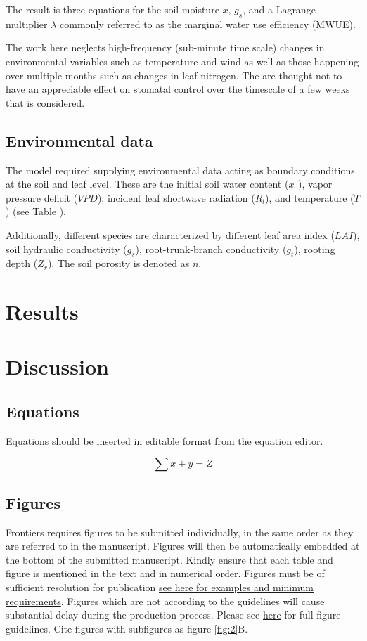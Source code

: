 \documentclass[utf8]{frontiersSCNS} %
\begin{document}
The result is three equations for the soil moisture $x$, $g_s$, and a Lagrange multiplier $\lambda$ commonly referred to as the marginal water use efficiency (MWUE). 

The work here neglects high-frequency (sub-minute time scale) changes in environmental variables such as temperature and wind as well as those happening over multiple months such as changes in leaf nitrogen. The are thought not to have an appreciable effect on stomatal control over the timescale of a few weeks that is considered.

\subsection{Environmental data}

The model required supplying environmental data acting as boundary conditions at the soil and leaf level. These are the initial soil water content ($x_0$), vapor pressure deficit ($VPD$), incident leaf shortwave radiation ($R_l$), and temperature ($T$) (see Table ).

Additionally, different species are characterized by different leaf area index ($LAI$), soil hydraulic conductivity ($g_s$), root-trunk-branch conductivity ($g_t$), rooting depth ($Z_r$). The soil porosity is denoted as $n$.

\section{Results}


\section{Discussion}

\subsection{Equations}
Equations should be inserted in editable format from the equation editor.

\begin{equation}
\sum x+ y =Z\label{eq:01}
\end{equation}

\subsection{Figures}
Frontiers requires figures to be submitted individually, in the same order as they are referred to in the manuscript. Figures will then be automatically embedded at the bottom of the submitted manuscript. Kindly ensure that each table and figure is mentioned in the text and in numerical order. Figures must be of sufficient resolution for publication \href{http://home.frontiersin.org/about/author-guidelines#ResolutionRequirements}{see here for examples and minimum requirements}. Figures which are not according to the guidelines will cause substantial delay during the production process. Please see \href{http://home.frontiersin.org/about/author-guidelines#GeneralStyleGuidelinesforFigures}{here} for full figure guidelines. Cite figures with subfigures as figure \ref{fig:2}B.
\end{document}
